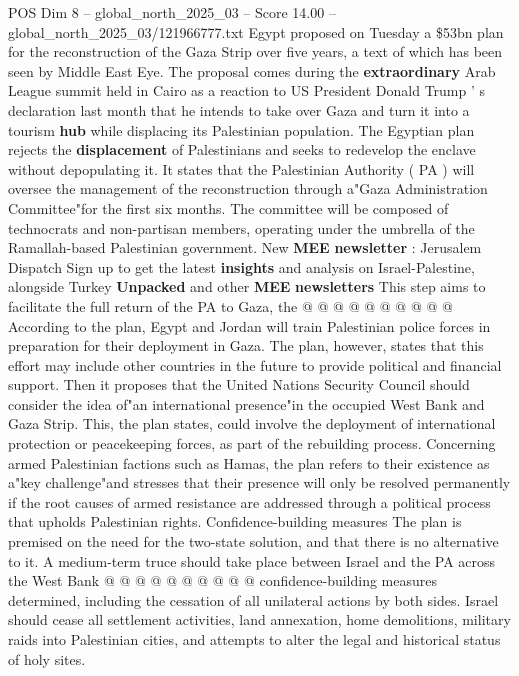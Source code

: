 \begin{textsample}{POS Dim 8 – global\_north\_2025\_03 – Score 14.00 – global\_north\_2025\_03/121966777.txt}  \label{ex:f8_pos_083}
Egypt proposed on Tuesday a \$53bn plan for the reconstruction of the Gaza Strip over five years, a text of which has been seen by Middle East Eye.
The proposal comes during the \textbf{extraordinary} Arab League summit held in Cairo as a reaction to US President Donald Trump ' s declaration last month that he intends to take over Gaza and turn it into a tourism \textbf{hub} while displacing its Palestinian population.
The Egyptian plan rejects the \textbf{displacement} of Palestinians and seeks to redevelop the enclave without depopulating it.
It states that the Palestinian Authority ( PA ) will oversee the management of the reconstruction through a"Gaza Administration Committee"for the first six months.
The committee will be composed of technocrats and non-partisan members, operating under the umbrella of the Ramallah-based Palestinian government.
New \textbf{MEE} \textbf{newsletter} : Jerusalem Dispatch Sign up to get the latest \textbf{insights} and analysis on Israel-Palestine, alongside Turkey \textbf{Unpacked} and other \textbf{MEE} \textbf{newsletters} This step aims to facilitate the full return of the PA to Gaza, the @ @ @ @ @ @ @ @ @ @ According to the plan, Egypt and Jordan will train Palestinian police forces in preparation for their deployment in Gaza.
The plan, however, states that this effort may include other countries in the future to provide political and financial support.
Then it proposes that the United Nations Security Council should consider the idea of"an international presence"in the occupied West Bank and Gaza Strip.
This, the plan states, could involve the deployment of international protection or peacekeeping forces, as part of the rebuilding process.
Concerning armed Palestinian factions such as Hamas, the plan refers to their existence as a"key challenge"and stresses that their presence will only be resolved permanently if the root causes of armed resistance are addressed through a political process that upholds Palestinian rights.
Confidence-building measures The plan is premised on the need for the two-state solution, and that there is no alternative to it.
A medium-term truce should take place between Israel and the PA across the West Bank @ @ @ @ @ @ @ @ @ @ confidence-building measures determined, including the cessation of all unilateral actions by both sides.
Israel should cease all settlement activities, land annexation, home demolitions, military raids into Palestinian cities, and attempts to alter the legal and historical status of holy sites.

\end{textsample}
